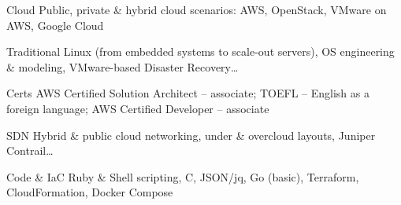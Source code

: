 
\begin{cvskills}

  \cvskill
    {Cloud} %
    {Public, private \& hybrid cloud scenarios: AWS, OpenStack, VMware on AWS, Google Cloud}

  \cvskill
    {Traditional} %
    {Linux (from embedded systems to scale-out servers), OS engineering \& modeling, VMware-based Disaster Recovery\dots}

  \cvskill
    {Certs} %
    {AWS Certified Solution Architect -- associate; TOEFL -- English as a foreign language; AWS Certified Developer -- associate}

  \cvskill
    {SDN} %
    {Hybrid \& public cloud networking, under \& overcloud layouts, Juniper Contrail\dots}

  \cvskill
    {Code \& IaC} %
    {Ruby \& Shell scripting, C, JSON/jq, Go (basic), Terraform, CloudFormation, Docker Compose}

\end{cvskills}
